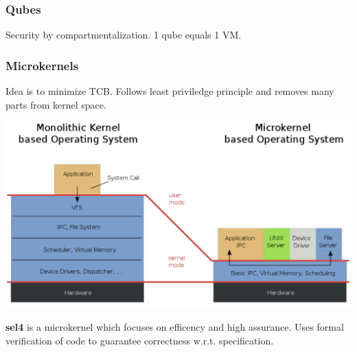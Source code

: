 \subsubsection{Qubes}
Security by compartmentalization. 1 qube equals 1 VM.

\subsubsection{Microkernels}
Idea is to minimize TCB. Follows least priviledge principle and removes many parts from kernel space.
\begin{center}
    \includegraphics[width=0.8\linewidth]{images/os_sec_MicrokernelVSMonolithic.png}
\end{center}

\textbf{sel4} is a microkernel which focuses on efficency and high assurance. Uses formal verification of code to guarantee correctness w.r.t. specification.
